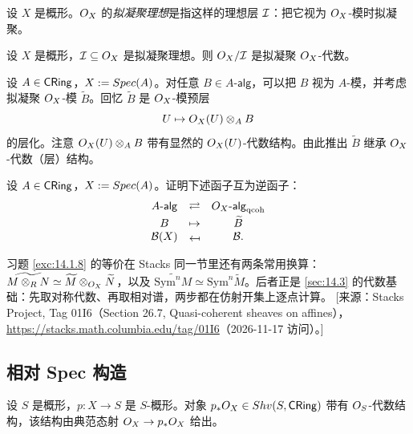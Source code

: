 \begin{definition}\label{def:14.1.5}
设 $X$ 是概形。$O_X$ 的\emph{拟凝聚理想}是指这样的理想层 $\mathcal{I}$：把它视为 $O_X$-模时拟凝聚。
\end{definition}

\begin{example}\label{ex:14.1.6}
设 $X$ 是概形，$\mathcal{I}\subseteq O_X$ 是拟凝聚理想。则 $O_X/\mathcal{I}$ 是拟凝聚 $O_X$-代数。
\end{example}

\begin{example}\label{ex:14.1.7}
设 $A\in\mathsf{CRing}$，$X:=Spec(A)$。对任意 $B\in A\text{-}\mathsf{alg}$，可以把 $B$ 视为 $A$-模，并考虑拟凝聚 $O_X$-模 $\widetilde{B}$。回忆 $\widetilde{B}$ 是 $O_X$-模预层
\[
U\mapsto O_X(U)\otimes_AB
\]
的层化。注意 $O_X(U)\otimes_AB$ 带有显然的 $O_X(U)$-代数结构。由此推出 $\widetilde{B}$ 继承 $O_X$-代数（层）结构。
\end{example}

\begin{exercise}\label{exc:14.1.8}
设 $A\in\mathsf{CRing}$，$X:=Spec(A)$。证明下述函子互为逆函子：
\[
\begin{array}{ccc}
A\text{-}\mathsf{alg} & \rightleftarrows & \cO_X\text{-}\mathsf{alg}_{\mathrm{qcoh}}\\[0.5ex]
B & \mapsto & \widetilde{B}\\
\cB(X) & \mapsfrom & \cB.
\end{array}
\]
\end{exercise}

\begin{yizhu}
习题 \ref{exc:14.1.8} 的等价在 Stacks 同一节里还有两条常用换算：$\widetilde{M\otimes_RN}\simeq\widetilde{M}\otimes_{O_X}\widetilde{N}$，以及 $\widetilde{\mathrm{Sym}^nM}\simeq\mathrm{Sym}^n\widetilde{M}$。后者正是 \ref{sec:14.3} 的代数基础：先取对称代数、再取相对谱，两步都在仿射开集上逐点计算。
[来源：Stacks Project, Tag 01I6（Section 26.7, Quasi-coherent sheaves on affines），\url{https://stacks.math.columbia.edu/tag/01I6}（2026-11-17 访问）。]
\end{yizhu}

\subsection{相对 Spec 构造}\label{sec:14.2}

\begin{construction}\label{con:14.2.1}
设 $S$ 是概形，$p\colon X\to S$ 是 $S$-概形。对象 $p_*O_X\in Shv(S,\mathsf{CRing})$ 带有 $O_S$-代数结构，该结构由典范态射 $O_X\to p_*O_X$ 给出。
\end{construction}

